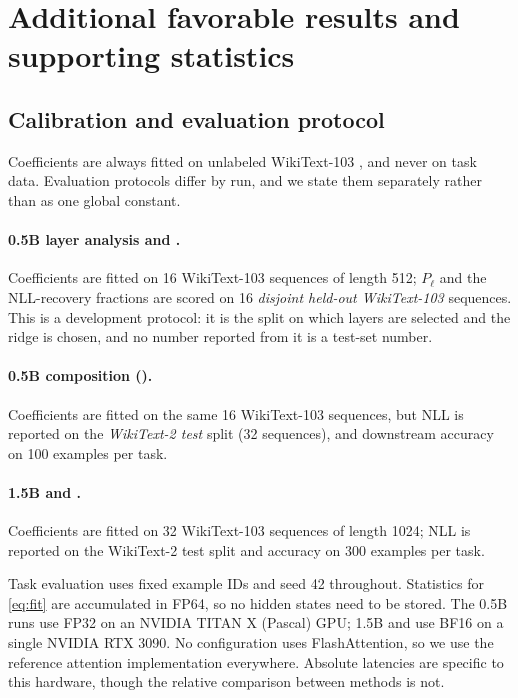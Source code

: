 \section{Additional favorable results and supporting statistics}
\label{sec:app-experiments}

\subsection{Calibration and evaluation protocol}
\label{sec:app-protocol}

Coefficients are always fitted on unlabeled WikiText-103 \citep{merity2017pointer}, and
never on task data. Evaluation protocols differ by run, and we state them separately
rather than as one global constant.

\paragraph{0.5B layer analysis and .} Coefficients are fitted on
16 WikiText-103 sequences of length 512; $P_\ell$ and the NLL-recovery
fractions are scored on 16 \emph{disjoint held-out WikiText-103} sequences. This is
a development protocol: it is the split on which layers are selected and the ridge is
chosen, and no number reported from it is a test-set number.

\paragraph{0.5B composition ().} Coefficients are fitted on the same
16 WikiText-103 sequences, but NLL is reported on the \emph{WikiText-2 test} split
(32 sequences), and downstream accuracy on 100 examples per task.

\paragraph{1.5B and \topscale.} Coefficients are fitted on 32 WikiText-103
sequences of length 1024; NLL is reported on the WikiText-2 test split and accuracy
on 300 examples per task.

Task evaluation uses fixed example IDs and seed 42 throughout. Statistics for
\cref{eq:fit} are accumulated in FP64, so no hidden states need to be stored. The 0.5B
runs use FP32 on an NVIDIA TITAN X (Pascal) GPU; 1.5B and \topscale use BF16 on a single
NVIDIA RTX 3090. No configuration uses FlashAttention, so we use the reference attention
implementation everywhere. Absolute latencies are specific to this hardware, though the
relative comparison between methods is not.

